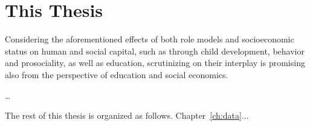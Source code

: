 \section{This Thesis}\label{ch:this_thesis}
Considering the aforementioned effects of both role models and socioeconomic status on human and social capital, such as through child development, behavior and prosociality, as well as education, scrutinizing on their interplay is promising also from the perspective of education and social economics.

\dots

The rest of this thesis is organized as follows. Chapter~\ref{ch:data}...